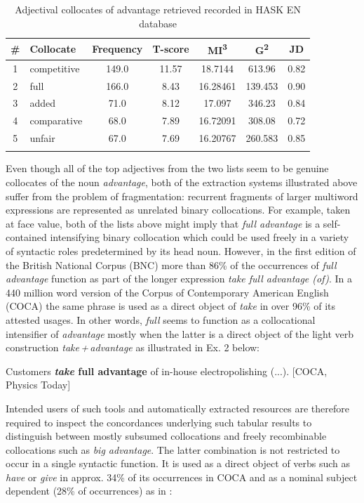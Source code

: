 \documentclass[output=paper]{langscibook}
\begin{document}
\begin{table}
\begin{tabular}{cl S[table-format=3.1] S[table-format=2.2] S[table-format=2.5] S[table-format=3.3] S[table-format=1.2]}
\lsptoprule
{\#} & {Collocate} & {Frequency} & {T-score} & {MI\textsuperscript{3}} & {G\textsuperscript{2}} & {JD}\\
 & competitive & 149.0 & 11.57 & 18.7144 & 613.96 & 0.82\\
2 & full & 166.0 & 8.43 & 16.28461 & 139.453 & 0.90\\
3 & added & 71.0 & 8.12 & 17.097 & 346.23 & 0.84\\
4 & comparative & 68.0 & 7.89 & 16.72091 & 308.08 & 0.72\\
5 & unfair & 67.0 & 7.69 & 16.20767 & 260.583 & 0.85\\
\lspbottomrule
\end{tabular}
\caption{\label{tab:pezik:2} Adjectival collocates of advantage retrieved recorded in HASK EN database}
\end{table}

Even though all of the top adjectives from the two lists seem to be genuine collocates of the noun \textit{advantage}, both of the extraction systems illustrated above suffer from the problem of fragmentation: recurrent fragments of larger multiword expressions are represented as unrelated binary collocations. For example, taken at face value, both of the lists above might imply that \textit{full advantage} is a self-contained intensifying binary collocation which could be used freely in a variety of syntactic roles predetermined by its head noun. However, in the first edition of the British National Corpus (BNC) more than 86\% of the occurrences of \textit{full advantage} function as part of the longer expression \textit{take full advantage (of)}. In a 440 million word version of the Corpus of Contemporary American English (COCA) the same phrase is used as a direct object of \textit{take} in over 96\% of its attested usages. In other words, \textit{full} seems to function as a collocational intensifier of \textit{advantage} mostly when the latter is a direct object of the light verb construction \textit{take\,+\,advantage} as illustrated in Ex. 2 below:

\ea
Customers \textbf{\textit{take} \textbf{full} \textbf{advantage}} of in-house electropolishing (...). [COCA, Physics Today]
\z

Intended users of such tools and automatically extracted resources are therefore required to inspect the concordances underlying such tabular results to distinguish between mostly subsumed collocations and freely recombinable collocations such as \textit{big advantage}. The latter combination is not restricted to occur in a single syntactic function. It is used as a direct object of verbs such as \textit{have} or \textit{give} in approx. 34\% of its occurrences in COCA and as a nominal subject dependent (28\% of occurrences) as in :
\end{document}
